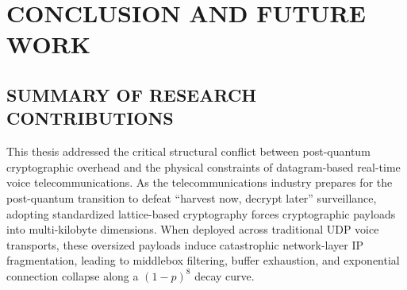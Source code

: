 \chapter{CONCLUSION AND FUTURE WORK}

\section{SUMMARY OF RESEARCH CONTRIBUTIONS}
This thesis addressed the critical structural conflict between post-quantum cryptographic overhead and the physical constraints of datagram-based real-time voice telecommunications. As the telecommunications industry prepares for the post-quantum transition to defeat ``harvest now, decrypt later'' surveillance, adopting standardized lattice-based cryptography forces cryptographic payloads into multi-kilobyte dimensions. When deployed across traditional UDP voice transports, these oversized payloads induce catastrophic network-layer IP fragmentation, leading to middlebox filtering, buffer exhaustion, and exponential connection collapse along a $(1-p)^8$ decay curve.

